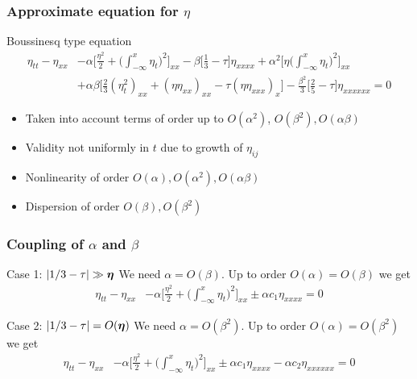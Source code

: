 \documentclass[pdftex,10pt,intlimits]{beamer}
\begin{document}
\begin{frame}
  \frametitle{Approximate equation for $\eta$}
\begin{block}{Boussinesq type equation}
{\begin{equation*}\begin{aligned}
\eta_{tt}-\eta_{xx} &-\alpha\Big[\frac{\eta^2}{2} + \Big(\int_{-\infty}^x\eta_t\Big)^2 \Big]_{xx} - \beta
\Big[\frac{1}{3} - \tau\Big]\eta_{xxxx} + \alpha^2\Big[\eta\Big(\int_{-\infty}^x\eta_t\Big)^2\Big]_{xx} \\
&+ \alpha\beta \Big[\frac{2}{3}(\eta_t^2)_{xx} + (\eta\eta_{xx})_{xx} -\tau(\eta\eta_{xxx})_x\Big] -
\frac{\beta^2}{3}\Big[\frac{2}{5}-\tau\Big]\eta_{xxxxxx} = 0
\end{aligned}\end{equation*}}
\end{block}
\begin{itemize}
\item Taken into account terms of order up to $O(\alpha^2)$, $O(\beta^2),O(\alpha\beta)$
\item Validity not uniformly in $t$ due to growth of $\eta_{ij}$
\item Nonlinearity of order $O(\alpha),O(\alpha^2),O(\alpha\beta)$
\item Dispersion of order $O(\beta),O(\beta^2)$
\end{itemize}
\end{frame}

\begin{frame}
  \frametitle{Coupling of $\alpha$ and $\beta$}
\begin{block}{Case 1: ${\lvert{1/3-\tau}\rvert}\gg{\boldsymbol{\eta}}$}
We need $\alpha=O(\beta)$. Up to order $O(\alpha)=O(\beta)$ we get
\begin{equation*}\begin{aligned}
\eta_{tt}-\eta_{xx} &-\alpha\Big[\frac{\eta^2}{2} + \Big(\int_{-\infty}^x\eta_t\Big)^2 \Big]_{xx} \pm \alpha c_1
\eta_{xxxx} = 0
\end{aligned}\end{equation*}
\end{block}
\begin{block}{Case 2: ${\lvert{1/3-\tau}\rvert}=O({\boldsymbol{\eta}})$}
We need $\alpha=O(\beta^2)$. Up to order $O(\alpha)=O(\beta^2)$ we get
\begin{equation*}\begin{aligned}
\eta_{tt}-\eta_{xx} &-\alpha\Big[\frac{\eta^2}{2} + \Big(\int_{-\infty}^x\eta_t\Big)^2 \Big]_{xx} \pm \alpha c_1
\eta_{xxxx} - \alpha c_2 \eta_{xxxxxx} = 0
\end{aligned}\end{equation*}
\end{block}
\end{frame}
\end{document}
